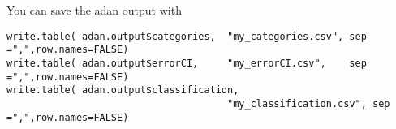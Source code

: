 \documentclass[a4paper]{article}
\begin{document}
You can save the adan output with
\begin{verbatim}
write.table( adan.output$categories,  "my_categories.csv", sep =",",row.names=FALSE)
write.table( adan.output$errorCI,     "my_errorCI.csv",    sep =",",row.names=FALSE)
write.table( adan.output$classification, 
                                      "my_classification.csv", sep =",",row.names=FALSE)
\end{verbatim}
% 
% 
% 
% 
% 
% 
% 
% 
 
\end{document}
